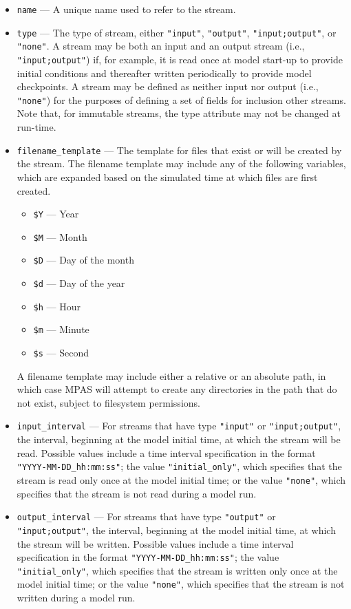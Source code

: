 \begin{itemize}
\item {\tt name} --- A unique name used to refer to the stream.
\item {\tt type} --- The type of stream, either {\tt "input"}, {\tt "output"}, {\tt "input;output"}, or {\tt "none"}. A stream may be both an input
and an output stream (i.e., {\tt "input;output"}) if, for example, it is read once at model start-up to provide initial conditions and thereafter written 
periodically to provide model checkpoints. A stream may be defined as neither input nor output (i.e., {\tt "none"}) for the purposes of defining a 
set of fields for inclusion other streams. Note that, for immutable streams, the type attribute may not be changed at run-time.
\item {\tt filename\_template} --- The template for files that exist or will be created by the stream. The filename template may include any of the
following variables, which are expanded based on the simulated time at which files are first created.
\begin{itemize}
\item {\tt \$Y} --- Year
\item {\tt \$M} --- Month
\item {\tt \$D} --- Day of the month
\item {\tt \$d} --- Day of the year
\item {\tt \$h} --- Hour
\item {\tt \$m} --- Minute
\item {\tt \$s} --- Second
\end{itemize}
A filename template may include either a relative or an absolute path, in which case MPAS will attempt to create any directories 
in the path that do not exist, subject to filesystem permissions.
\item {\tt input\_interval} --- For streams that have type {\tt "input"} or {\tt "input;output"}, the interval, beginning at the model initial time,
at which the stream will be read. Possible values include a time interval specification in the format {\tt "YYYY-MM-DD\_hh:mm:ss"}; the value 
{\tt "initial\_only"}, which specifies that the stream is read only once at the model initial time; or the value {\tt "none"}, which specifies that 
the stream is not read during a model run.
\item {\tt output\_interval} --- For streams that have type {\tt "output"} or {\tt "input;output"}, the interval, beginning at the model initial time,
at which the stream will be written. Possible values include a time interval specification in the format {\tt "YYYY-MM-DD\_hh:mm:ss"}; the value 
{\tt "initial\_only"}, which specifies that the stream is written only once at the model initial time; or the value {\tt "none"}, which specifies that 
the stream is not written during a model run.
\end{itemize}

